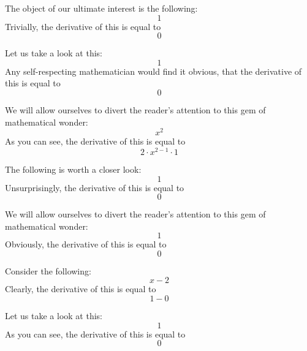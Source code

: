 \documentclass{article}
\begin{document}
The object of our ultimate interest is the following:
\begin{equation}
1 
\end{equation}
Trivially, the derivative of this is equal to
\begin{equation}
0 
\end{equation}

Let us take a look at this:
\begin{equation}
1 
\end{equation}
Any self-respecting mathematician would find it obvious, that the derivative of this is equal to
\begin{equation}
0 
\end{equation}

We will allow ourselves to divert the reader's attention to this gem of mathematical wonder:
\begin{equation}
x ^{2 } 
\end{equation}
As you can see, the derivative of this is equal to
\begin{equation}
2 \cdot x ^{2 - 1 } \cdot 1 
\end{equation}

The following is worth a closer look:
\begin{equation}
1 
\end{equation}
Unsurprisingly, the derivative of this is equal to
\begin{equation}
0 
\end{equation}

We will allow ourselves to divert the reader's attention to this gem of mathematical wonder:
\begin{equation}
1 
\end{equation}
Obviously, the derivative of this is equal to
\begin{equation}
0 
\end{equation}

Consider the following:
\begin{equation}
x - 2 
\end{equation}
Clearly, the derivative of this is equal to
\begin{equation}
1 - 0 
\end{equation}

Let us take a look at this:
\begin{equation}
1 
\end{equation}
As you can see, the derivative of this is equal to
\begin{equation}
0 
\end{equation}
\end{document}
